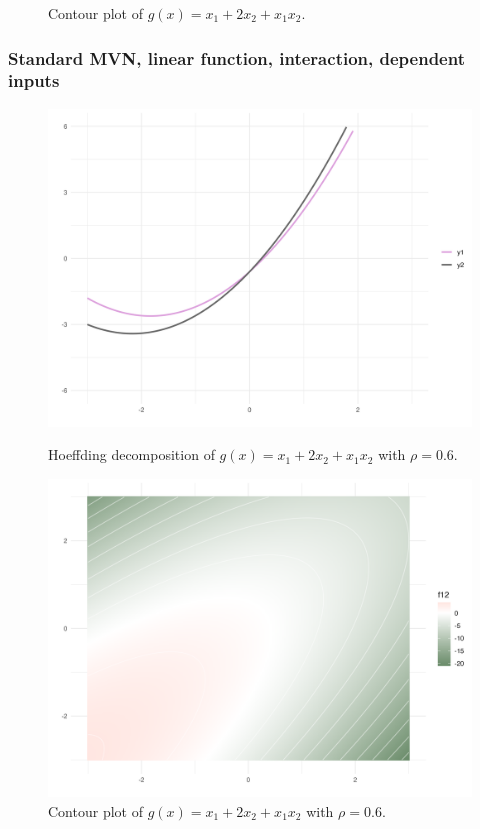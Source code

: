 \begin{figure}[htpb]
\begin{minipage}[t]{0.49\textwidth}
        \caption{Contour plot of $g(x) = x_1 + 2 x_2 + x_1 x_2$.}
        \label{fig:contour_ex1}
    \end{minipage}
\end{figure}

\subsubsection*{Standard MVN, linear function, interaction, dependent inputs}
\begin{figure}[htpb]
    \centering
    \begin{minipage}[t]{0.49\textwidth}
        \centering
        \includegraphics[width=\textwidth]{images/p_main_effect_ex1_rho06.png}
        \caption{Hoeffding decomposition of $g(x) = x_1 + 2 x_2 + x_1 x_2$ with $\rho = 0.6$.}
        \label{fig:main_effects_ex1_rho06}
    \end{minipage}%
    \hfill
    \begin{minipage}[t]{0.49\textwidth}
        \centering
        \includegraphics[width=\textwidth]{images/p_contour_ex1_rho06.png}
        \caption{Contour plot of $g(x) = x_1 + 2 x_2 + x_1 x_2$ with $\rho = 0.6$.}
        \label{fig:contour_ex1_rho06}
    \end{minipage}
\end{figure}

